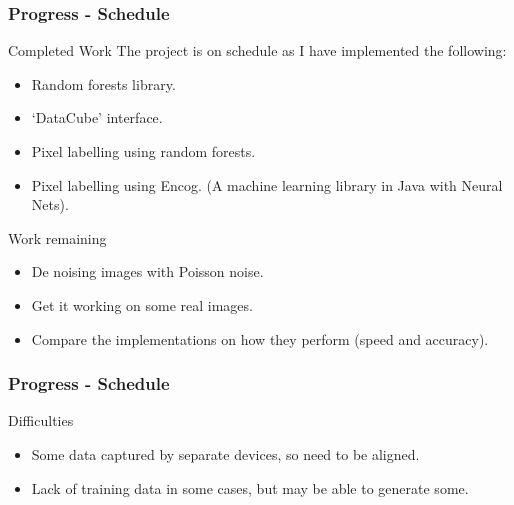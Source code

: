 \documentclass{beamer}
\begin{document}
\begin{frame}
    \frametitle{Progress - Schedule}

    \begin{block}{Completed Work}
        The project is on schedule as I have implemented the following:
        \begin{itemize}
            \item Random forests library.
            \item `DataCube' interface.
            \item Pixel labelling using random forests.
            \item Pixel labelling using Encog. (A machine learning library in Java with Neural Nets).
        \end{itemize}
    \end{block}


    \begin{block}{Work remaining}
        \begin{itemize}
            \item De noising images with Poisson noise.
            \item Get it working on some real images.
            \item Compare the implementations on how they perform (speed and accuracy).
        \end{itemize}
    \end{block}
\end{frame}

\begin{frame}
    \frametitle{Progress - Schedule}

    \begin{block}{Difficulties}
        \begin{itemize}
            \item Some data captured by separate devices, so need to be aligned.
            \item Lack of training data in some cases, but may be able to generate some.
        \end{itemize}
    \end{block}
\end{frame}
\end{document}
